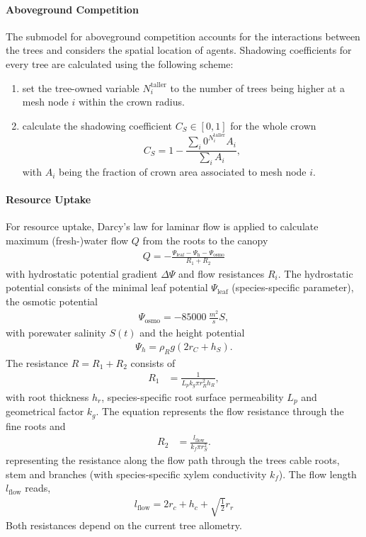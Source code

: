 \paragraph{\textbf{Aboveground Competition}}
The submodel for aboveground competition accounts for the interactions between the trees and considers the spatial location of agents.
Shadowing coefficients for every tree are calculated using the following scheme:
\begin{enumerate}
\item set the tree-owned variable $N^{\text{taller}}_i$ to the number of trees being higher at a mesh node $i$ within the crown radius.
\item calculate the shadowing coefficient $C_S\in [0,1]$ for the whole crown
\begin{equation}
C_S = 1-\frac{\sum_i 0^{N^{\text{taller}}_i} A_i}{\sum_i A_i},
\end{equation}
with $A_i$ being the fraction of crown area associated to mesh node $i$.
\end{enumerate}
\paragraph{\textbf{Resource Uptake}}
For resource uptake, Darcy's law for laminar flow is applied to calculate maximum (fresh-)water flow $Q$ from the roots to the canopy
\begin{align}
Q = -\frac{\Psi_{\text{leaf}}- \Psi_{\text{h}} -\Psi_{\text{osmo}}}{R_1 + R_2}
\end{align}
with hydrostatic potential gradient $\Delta \Psi$ and flow resistances $R_i$.
The hydrostatic potential consists of the minimal leaf potential $\Psi_{\text{leaf}}$ (species-specific parameter), the osmotic potential 
\begin{align}
\Psi_{\text{osmo}}= -\SI{85000}{\frac{m^2}{s}}S,
\end{align}
with porewater salinity $S(t)$ and the height potential 
\begin{align}
\Psi_h = \rho_R g (2r_C+h_S).
\end{align}
The resistance $R = R_1+R_2$ consists of
\begin{align}
R_1 &= \frac{1}{L_p k_g \pi r_R^2 h_R} ,\end{align}
with root thickness $h_r$, species-specific root surface permeability $L_p$ and geometrical factor $k_g$.
The equation represents the flow resistance through the fine roots and 
\begin{align}
R_2 &= \frac{l_{\text{flow}}}{k_f \pi r_S^2}.
\end{align}
representing the resistance along the flow path through the trees cable roots, stem and branches (with species-specific xylem conductivity $k_f$).
The flow length $l_{\text{flow}}$ reads,
\begin{align}
l_{\text{flow}} = 2 r_c + h_c + \sqrt{\frac{1}{2}} r_r
\end{align}
Both resistances depend on the current tree allometry.

